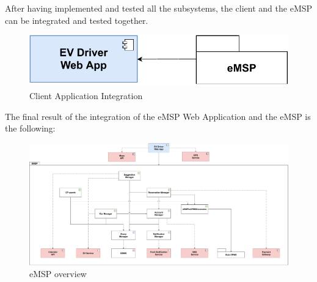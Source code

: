After having implemented and tested all the subsystems, the client and the eMSP can be integrated 
and tested together. 
\begin{figure}[H]
    \centering
    \includegraphics[scale=0.6]{src/Integration/eMSP_Frontend.pdf}
    \caption{Client Application Integration}
\end{figure}
The final result of the integration of the eMSP Web Application and the eMSP is the following:
\begin{figure}[H]
    \centering
    \hspace*{-2cm}
    \includegraphics[scale=0.31]{src/Integration/eMSP_Overview.pdf}
    \caption{eMSP overview}
\end{figure}


